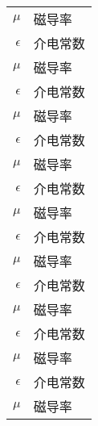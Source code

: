 \begin{mainsymbol}
\begin{longtable}{rl}
 $\mu$ 		& 磁导率 \\
 $\epsilon$ 	& 介电常数 \\
 $\mu$ 		& 磁导率 \\
 $\epsilon$     & 介电常数 \\
 $\mu$ 		& 磁导率 \\
 $\epsilon$     & 介电常数 \\
 $\mu$ 		& 磁导率 \\
 $\epsilon$     & 介电常数 \\
 $\mu$ 		& 磁导率 \\
 $\epsilon$ 	& 介电常数 \\
 $\mu$ 		& 磁导率 \\
 $\epsilon$     & 介电常数 \\
 $\mu$ 		& 磁导率 \\
 $\epsilon$     & 介电常数 \\
 $\mu$ 		& 磁导率 \\
 $\epsilon$     & 介电常数 \\
 $\mu$ 		& 磁导率 \\
\end{longtable}

\end{mainsymbol}
